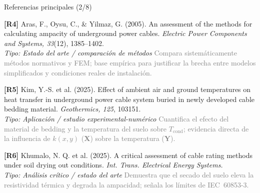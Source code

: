 \documentclass[aspectratio=169]{beamer}
\begin{document}
\begin{frame}{Referencias principales (2/8)}
\small\justifying

\textbf{[R4]} Aras, F., Oysu, C., \& Yilmaz, G. (2005). An assessment of the
methods for calculating ampacity of underground power cables. \textit{Electric
Power Components and Systems, 33}(12), 1385--1402.\\
\textcolor{blue!60!black}{\footnotesize\textit{Tipo: Estado del arte / comparación de métodos}} \quad
\textcolor{gray}{\footnotesize Compara sistemáticamente métodos normativos y FEM;
base empírica para justificar la brecha entre modelos simplificados y
condiciones reales de instalación.}

\medskip
\textbf{[R5]} Kim, Y.-S. et al. (2025). Effect of ambient air and ground
temperatures on heat transfer in underground power cable system buried in newly
developed cable bedding material. \textit{Geothermics, 125}, 103151.\\
\textcolor{blue!60!black}{\footnotesize\textit{Tipo: Aplicación / estudio experimental-numérico}} \quad
\textcolor{gray}{\footnotesize Cuantifica el efecto del material de bedding y la
temperatura del suelo sobre $T_{\text{cond}}$; evidencia directa de la
influencia de $k(x,y)$ (\textbf{X}) sobre la temperatura (\textbf{Y}).}

\medskip
\textbf{[R6]} Khumalo, N. Q. et al. (2025). A critical assessment of cable
rating methods under soil drying out conditions. \textit{Int. Trans. Electrical
Energy Systems.}\\
\textcolor{blue!60!black}{\footnotesize\textit{Tipo: Análisis crítico / estado del arte}} \quad
\textcolor{gray}{\footnotesize Demuestra que el secado del suelo eleva la
resistividad térmica y degrada la ampacidad; señala los límites de IEC~60853-3.}
\end{frame}
\end{document}
